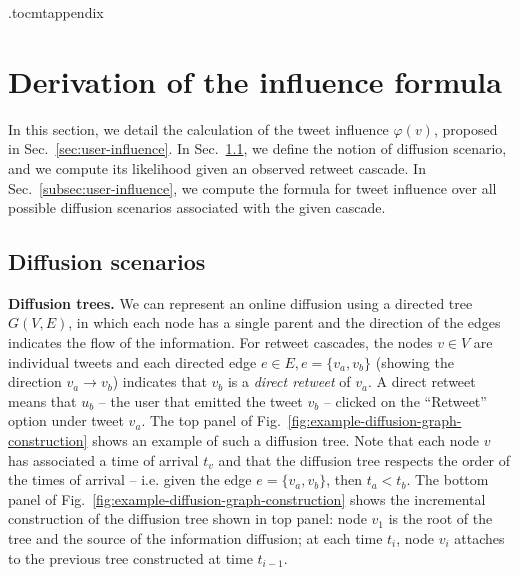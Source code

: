 %
\newpage
\appendix
%
\etocdepthtag.toc{mtappendix}
\tableofcontents

\section{Derivation of the influence formula}
\label{si-sec:infl-derivation}

In this section, we detail the calculation of the tweet influence $\varphi(v)$, proposed in Sec.~\ref{sec:user-influence}.
In Sec.~\ref{subsec:diffusion-scenario}, we define the notion of diffusion scenario, and we compute its likelihood given an observed retweet cascade.
In Sec.~\ref{subsec:user-influence}, we compute the formula for tweet influence over all possible diffusion scenarios associated with the given cascade.

\subsection{Diffusion scenarios}
\label{subsec:diffusion-scenario}

\textbf{Diffusion trees.}
We can represent an online diffusion using a directed tree $G(V, E)$, in which each node has a single parent and the direction of the edges indicates the flow of the information.
For retweet cascades, the nodes $v \in V$ are individual tweets and each directed edge $e \in E, e = \{v_a, v_b\}$ (showing the direction $v_a \longrightarrow v_b$) indicates that $v_b$ is a \emph{direct retweet} of $v_a$.
A direct retweet means that $u_b$ -- the user that emitted the tweet $v_b$ -- clicked on the ``Retweet'' option under tweet $v_a$.
The top panel of Fig.~\ref{fig:example-diffusion-graph-construction} shows an example of such a diffusion tree.
Note that each node $v$ has associated a time of arrival $t_v$ and that the diffusion tree respects the order of the times of arrival -- i.e. given the edge $e = \{v_a, v_b\}$, then $t_a < t_b$.
The bottom panel of Fig.~\ref{fig:example-diffusion-graph-construction} shows the incremental construction of the diffusion tree shown in top panel:
node $v_1$ is the root of the tree and the source of the information diffusion; 
at each time $t_i$, node $v_i$ attaches to the previous tree constructed at time $t_{i-1}$.

